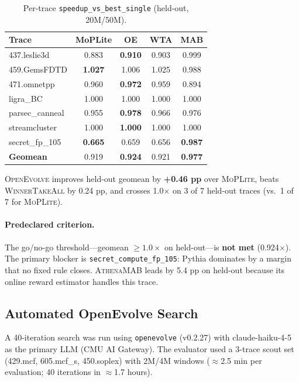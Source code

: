 \documentclass[10pt,twocolumn]{article}
\begin{document}
\begin{table}[h]
\centering
\caption{Per-trace \texttt{speedup\_vs\_best\_single} (held-out, 20M/50M).}
\label{tab:heldout}
\small
\begin{tabular}{lcccc}
\toprule
\textbf{Trace} & \textbf{MoPLite} & \textbf{OE} & \textbf{WTA} & \textbf{MAB} \\
\midrule
437.leslie3d     & 0.883 & \textbf{0.910} & 0.903 & 0.999 \\
459.GemsFDTD     & \textbf{1.027} & 1.006 & 1.025 & 0.988 \\
471.omnetpp      & 0.960 & \textbf{0.972} & 0.959 & 0.894 \\
ligra\_BC        & 1.000 & 1.000 & 1.000 & 1.000 \\
parsec\_canneal  & 0.955 & \textbf{0.978} & 0.966 & 0.976 \\
streamcluster    & 1.000 & \textbf{1.000} & 1.000 & 1.000 \\
secret\_fp\_105  & \textbf{0.665} & 0.659 & 0.656 & \textbf{0.987} \\
\midrule
\textbf{Geomean} & 0.919 & \textbf{0.924} & 0.921 & \textbf{0.977} \\
\bottomrule
\end{tabular}
\end{table}

\textsc{OpenEvolve} improves held-out geomean by \textbf{+0.46 pp} over
\textsc{MoPLite}, beats \textsc{WinnerTakeAll} by 0.24 pp, and crosses
1.0$\times$ on 3 of 7 held-out traces (vs.\ 1 of 7 for \textsc{MoPLite}).

\paragraph{Predeclared criterion.} The go/no-go threshold—geomean $\geq
1.0\times$ on held-out—is \textbf{not met} (0.924$\times$). The primary
blocker is \texttt{secret\_compute\_fp\_105}: Pythia dominates by a margin
that no fixed rule closes. \textsc{AthenaMAB} leads by 5.4 pp on held-out
because its online reward estimator handles this trace.

\subsection{Automated OpenEvolve Search}

A 40-iteration search was run using \texttt{openevolve} (v0.2.27) with
claude-haiku-4-5 as the primary LLM (CMU AI Gateway). The evaluator used a
3-trace scout set (429.mcf, 605.mcf\_s, 450.soplex) with 2M/4M windows
($\approx$2.5 min per evaluation; 40 iterations in $\approx$1.7 hours).
\end{document}
